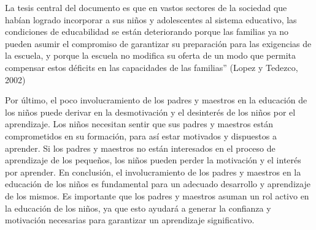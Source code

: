 La tesis central del documento es que en vastos sectores de la sociedad que habían logrado
incorporar a sus niños y adolescentes al sistema educativo, las condiciones de educabilidad se
están deteriorando porque las familias ya no pueden asumir el compromiso de garantizar su
preparación para las exigencias de la escuela, y porque la escuela no modifica su oferta de un
modo que permita compensar estos déficits en las capacidades de las familias” (Lopez y
Tedezco, 2002)

Por último, el poco involucramiento de los padres y maestros en la educación de los niños
puede derivar en la desmotivación y el desinterés de los niños por el aprendizaje. Los niños
necesitan sentir que sus padres y maestros están comprometidos en su formación, para así estar
motivados y dispuestos a aprender. Si los padres y maestros no están interesados en el proceso de
aprendizaje de los pequeños, los niños pueden perder la motivación y el interés por aprender.
En conclusión, el involucramiento de los padres y maestros en la educación de los niños es
fundamental para un adecuado desarrollo y aprendizaje de los mismos. Es importante que los
padres y maestros asuman un rol activo en la educación de los niños, ya que esto ayudará a
generar la confianza y motivación necesarias para garantizar un aprendizaje significativo.